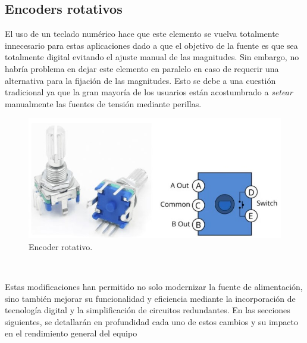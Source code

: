 \subsection{Encoders rotativos}\par 
El uso de un teclado numérico hace que este elemento se vuelva totalmente innecesario para estas aplicaciones dado a que el objetivo de la fuente es que sea totalmente digital evitando el ajuste manual de las magnitudes. Sin embargo, no habría problema en dejar este elemento en paralelo en caso de requerir una alternativa para la fijación de las magnitudes. Esto se debe a una cuestión tradicional ya que la gran mayoría de los usuarios están acostumbrado a \textit{setear} manualmente las fuentes de tensión mediante perillas.
\begin{figure}[H]
    \centering
    \includegraphics[scale=0.5]{./imagenes/encoder_rotativo.jpg}
    \caption{Encoder rotativo.}
    \label{F:encoder_rotativo}
\end{figure}
\ 
\ 
\par 
Estas modificaciones han permitido no solo modernizar la fuente de alimentación, sino también mejorar su funcionalidad y eficiencia mediante la incorporación de tecnología digital y la simplificación de circuitos redundantes. En las secciones siguientes, se detallarán en profundidad cada uno de estos cambios y su impacto en el rendimiento general del equipo





